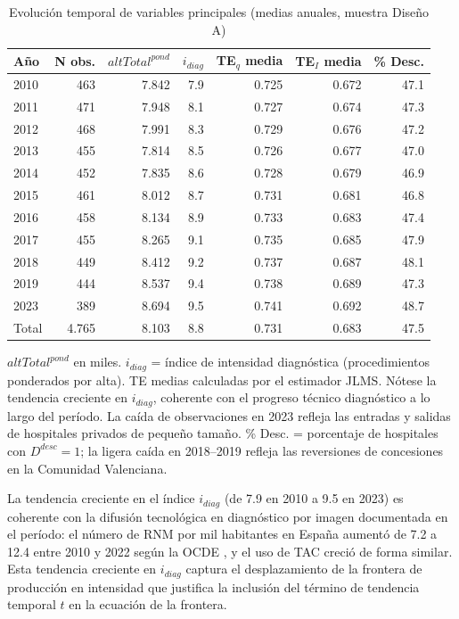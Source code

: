 \documentclass[12pt, a4paper, twoside, openright]{book}
\theoremstyle{plain}
\theoremstyle{definition}
\theoremstyle{remark}
\begin{document}
\begin{table}[htbp]
\centering
\caption{Evolución temporal de variables principales (medias anuales, muestra Diseño A)}
\label{tab:descriptivos_tiempo}
\begin{threeparttable}
\small
\begin{tabular}{lrrrrrr}
\toprule
\textbf{Año} & \textbf{N obs.} & \textbf{$altTotal^{pond}$} & \textbf{$i_{diag}$} & \textbf{TE$_q$ media} & \textbf{TE$_I$ media} & \textbf{\% Desc.} \\
\midrule
2010 & 463 & 7.842 & 7.9 & 0.725 & 0.672 & 47.1 \\
2011 & 471 & 7.948 & 8.1 & 0.727 & 0.674 & 47.3 \\
2012 & 468 & 7.991 & 8.3 & 0.729 & 0.676 & 47.2 \\
2013 & 455 & 7.814 & 8.5 & 0.726 & 0.677 & 47.0 \\
2014 & 452 & 7.835 & 8.6 & 0.728 & 0.679 & 46.9 \\
2015 & 461 & 8.012 & 8.7 & 0.731 & 0.681 & 46.8 \\
2016 & 458 & 8.134 & 8.9 & 0.733 & 0.683 & 47.4 \\
2017 & 455 & 8.265 & 9.1 & 0.735 & 0.685 & 47.9 \\
2018 & 449 & 8.412 & 9.2 & 0.737 & 0.687 & 48.1 \\
2019 & 444 & 8.537 & 9.4 & 0.738 & 0.689 & 47.3 \\
2023 & 389 & 8.694 & 9.5 & 0.741 & 0.692 & 48.7 \\
\midrule
Total & 4.765 & 8.103 & 8.8 & 0.731 & 0.683 & 47.5 \\
\bottomrule
\end{tabular}
\begin{tablenotes}
  \small
  \item $altTotal^{pond}$ en miles. $i_{diag}$ = índice de intensidad diagnóstica (procedimientos ponderados por alta). TE medias calculadas por el estimador JLMS. Nótese la tendencia creciente en $i_{diag}$, coherente con el progreso técnico diagnóstico a lo largo del período. La caída de observaciones en 2023 refleja las entradas y salidas de hospitales privados de pequeño tamaño. \% Desc. = porcentaje de hospitales con $D^{desc}=1$; la ligera caída en 2018--2019 refleja las reversiones de concesiones en la Comunidad Valenciana.
\end{tablenotes}
\end{threeparttable}
\end{table}

La tendencia creciente en el índice $i_{diag}$ (de 7.9 en 2010 a 9.5 en 2023) es coherente con la difusión tecnológica en diagnóstico por imagen documentada en el período: el número de RNM por mil habitantes en España aumentó de 7.2 a 12.4 entre 2010 y 2022 según la OCDE \citep{oecd2023}, y el uso de TAC creció de forma similar. Esta tendencia creciente en $i_{diag}$ captura el desplazamiento de la frontera de producción en intensidad que justifica la inclusión del término de tendencia temporal $t$ en la ecuación de la frontera.
\end{document}
